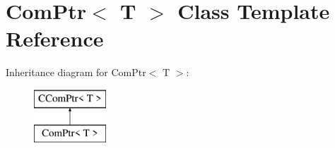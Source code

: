 \hypertarget{class_com_ptr}{}\section{Com\+Ptr$<$ T $>$ Class Template Reference}
\label{class_com_ptr}
Inheritance diagram for Com\+Ptr$<$ T $>$\+:\begin{figure}[H]
\begin{center}
\leavevmode
\includegraphics[height=2.000000cm]{d7/dc6/class_com_ptr}
\end{center}
\end{figure}
